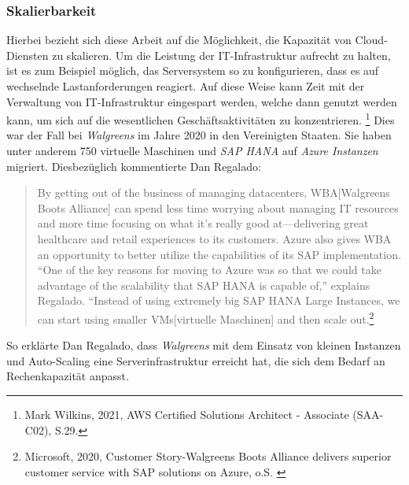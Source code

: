\subsubsection{Skalierbarkeit}
Hierbei bezieht sich diese Arbeit auf die Möglichkeit, die Kapazität von Cloud-Diensten zu skalieren. Um die Leistung der IT-Infrastruktur aufrecht zu halten, ist es zum Beispiel möglich, das Serversystem so zu konfigurieren, dass es auf wechselnde Lastanforderungen reagiert.
%
Auf diese Weise kann Zeit mit der Verwaltung von IT-Infrastruktur eingespart werden, welche dann genutzt werden kann, um sich auf die wesentlichen Geschäftsaktivitäten zu konzentrieren.
\footnote{Mark Wilkins, 2021, AWS Certified Solutions Architect - Associate (SAA-C02), S.29.\cite{AWS1}}
Dies war der Fall bei \textit{Walgreens} im Jahre 2020 in den Vereinigten Staaten.
Sie haben unter anderem 750 virtuelle Maschinen und \textit{SAP HANA} auf \textit{Azure Instanzen} migriert.
Diesbezüglich kommentierte Dan Regalado:
\begin{quote}
      By getting out of the business of managing datacenters, WBA[Walgreens Boots Alliance] can spend less time worrying about managing IT resources and more time focusing on what it’s really good at—delivering great healthcare and retail experiences to its customers. Azure also gives WBA an opportunity to better utilize the capabilities of its SAP implementation. “One of the key reasons for moving to Azure was so that we could take advantage of the scalability that SAP HANA is capable of,” explains Regalado. “Instead of using extremely big SAP HANA Large Instances, we can start using smaller VMs[virtuelle Maschinen] and then scale out.\footnote{Microsoft, 2020, Customer Story-Walgreens Boots Alliance delivers superior customer service with SAP solutions on Azure, o.S. \cite{AZU01}}
\end{quote}
So erklärte Dan Regalado, dass \textit{Walgreens} mit dem Einsatz von kleinen Instanzen und Auto-Scaling eine Serverinfrastruktur erreicht hat, die sich dem Bedarf an Rechenkapazität anpasst. 


